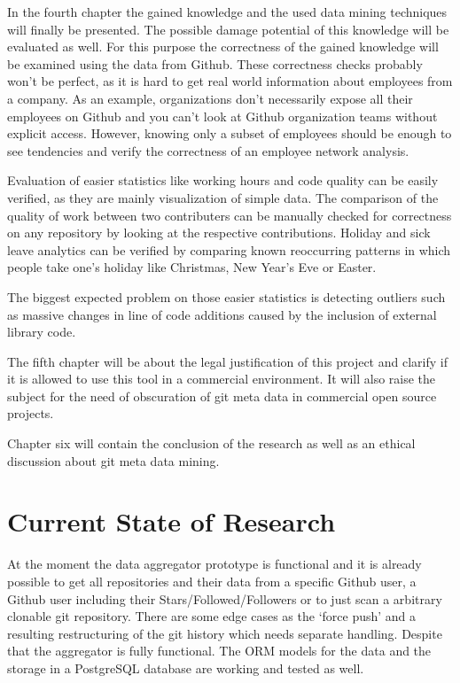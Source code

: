 In the fourth chapter the gained knowledge and the used data mining techniques will finally be presented.
The possible damage potential of this knowledge will be evaluated as well. For this purpose the correctness of the gained knowledge will be examined using the data from Github.
These correctness checks probably won't be perfect, as it is hard to get real world information about employees from a company.
As an example, organizations don't necessarily expose all their employees on Github and you can't look at Github organization teams without explicit access.
However, knowing only a subset of employees should be enough to see tendencies and verify the correctness of an employee network analysis.

Evaluation of easier statistics like working hours and code quality can be easily verified, as they are mainly visualization of simple data.
The comparison of the quality of work between two contributers can be manually checked for correctness on any repository by looking at the respective contributions.
Holiday and sick leave analytics can be verified by comparing known reoccurring patterns in which people take one's holiday like Christmas, New Year's Eve or Easter.

The biggest expected problem on those easier statistics is detecting outliers such as massive changes in line of code additions caused by the inclusion of external library code.

The fifth chapter will be about the legal justification of this project and clarify if it is allowed to use this tool in a commercial environment.
It will also raise the subject for the need of obscuration of git meta data in commercial open source projects.

Chapter six will contain the conclusion of the research as well as an ethical discussion about git meta data mining.


\chapter{Current State of Research}

At the moment the data aggregator prototype is functional and it is already possible to get all repositories and their data from a specific Github user, a Github user including their Stars/Followed/Followers or to just scan a arbitrary clonable git repository.
There are some edge cases as the `force push' and a resulting restructuring of the git history which needs separate handling. Despite that the aggregator is fully functional.
The ORM models for the data and the storage in a PostgreSQL database are working and tested as well.


\begingroup
\footnotesize
\let\clearpage\relax
\endgroup
\renewcommand*{\bibfont}{\footnotesize}
\printbibliography{}


